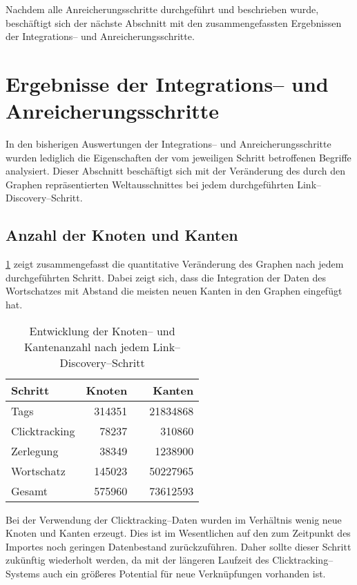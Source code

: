 Nachdem alle Anreicherungsschritte durchgeführt und beschrieben wurde, beschäftigt sich der nächste Abschnitt mit den zusammengefassten Ergebnissen der Integrations-- und Anreicherungsschritte.

\section{Ergebnisse der Integrations-- und Anreicherungsschritte}
\label{lda_results}

In den bisherigen Auswertungen der Integrations-- und Anreicherungsschritte wurden lediglich die Eigenschaften der vom jeweiligen Schritt betroffenen Begriffe analysiert. Dieser Abschnitt beschäftigt sich mit der Veränderung des durch den Graphen repräsentierten Weltausschnittes bei jedem durchgeführten Link--Discovery--Schritt.

\subsection{Anzahl der Knoten und Kanten}

\cref{tab:discovery_amounts} zeigt zusammengefasst die quantitative Veränderung des Graphen nach jedem durchgeführten Schritt. Dabei zeigt sich, dass die Integration der Daten des Wortschatzes mit Abstand die meisten neuen Kanten in den Graphen eingefügt hat. 

\begin{table}[h]
\centering
\begin{tabular}{lrcr}
    \toprule
    Schritt & Knoten & \phantom{abc} & Kanten \\
    \midrule
    Tags & \num{314351} && \num{21834868} \\
    Clicktracking & \num{78237} && \num{310860} \\
    Zerlegung & \num{38349} && \num{1238900} \\
    Wortschatz & \num{145023} && \num{50227965} \\
    \midrule
    Gesamt & \num{575960} && \num{73612593} \\
    \bottomrule
\end{tabular}
\caption{Entwicklung der Knoten-- und Kantenanzahl nach jedem Link--Discovery--Schritt}
\label{tab:discovery_amounts}
\end{table}

Bei der Verwendung der Clicktracking--Daten wurden im Verhältnis wenig neue Knoten und Kanten erzeugt. Dies ist im Wesentlichen auf den zum Zeitpunkt des Importes noch geringen Datenbestand zurückzuführen. Daher sollte dieser Schritt zukünftig wiederholt werden, da mit der längeren Laufzeit des Clicktracking--Systems auch ein größeres Potential für neue Verknüpfungen vorhanden ist.

